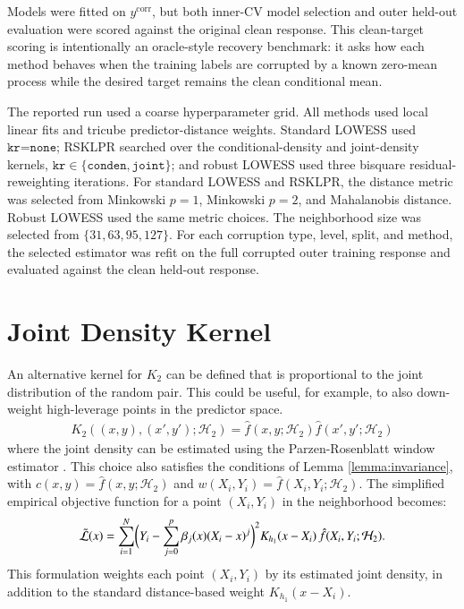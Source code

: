 \documentclass[preprint,1p,times,authoryear]{elsarticle}
\begin{document}
Models were fitted on \(y^{\mathrm{corr}}\), but both inner-CV model selection and outer held-out evaluation were scored against the original clean response. This clean-target scoring is intentionally an oracle-style recovery benchmark: it asks how each method behaves when the training labels are corrupted by a known zero-mean process while the desired target remains the clean conditional mean.

The reported run used a coarse hyperparameter grid. All methods used local linear fits and tricube predictor-distance weights. Standard LOWESS used \(\texttt{kr=none}\); RSKLPR searched over the conditional-density and joint-density kernels, \(\texttt{kr} \in \{\texttt{conden},\texttt{joint}\}\); and robust LOWESS used three bisquare residual-reweighting iterations. For standard LOWESS and RSKLPR, the distance metric was selected from Minkowski \(p=1\), Minkowski \(p=2\), and Mahalanobis distance. Robust LOWESS used the same metric choices. The neighborhood size was selected from \(\{31,63,95,127\}\). For each corruption type, level, split, and method, the selected estimator was refit on the full corrupted outer training response and evaluated against the clean held-out response.

\section{Joint Density Kernel}
\label{appendix:joint_density_kernel}
An alternative kernel for $K_2$ can be defined that is proportional to the joint distribution of the random pair. This could be useful, for example, to also down-weight high-leverage points in the predictor space.
\begin{align}
K_2 \left((x,y),(x', y') ; \mathcal{H}_2 \right) = \hat{f}(x,y ; \mathcal{H}_2) \hat{f}(x',y'; \mathcal{H}_2)
\end{align}
where the joint density can be estimated using the Parzen-Rosenblatt window estimator \citep{Rosenblatt1956,Parzen1962}. This choice also satisfies the conditions of Lemma \ref{lemma:invariance}, with $c(x,y)=\hat{f}(x,y; \mathcal{H}_2)$ and $w(X_i, Y_i) = \hat{f}(X_i, Y_i; \mathcal{H}_2)$. The simplified empirical objective function for a point $(X_i, Y_i)$ in the neighborhood becomes:
\[
\tilde{\mathcal{L}}(x)
=\sum_{i=1}^{N}
\Bigl(Y_i-\sum_{j=0}^{p}\beta_j(x)(X_i - x)^j\Bigr)^2
K_{h_1}(x-X_i)\,\hat{f}(X_i, Y_i; \mathcal{H}_2).
\]
This formulation weights each point $(X_i, Y_i)$ by its estimated joint density, in addition to the standard distance-based weight $K_{h_1}(x-X_i)$.
\end{document}
